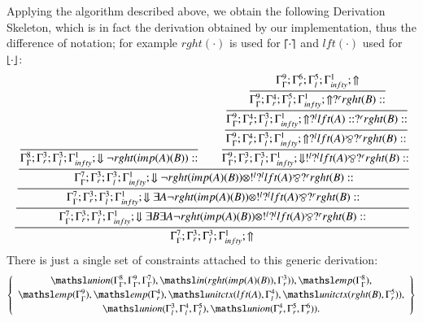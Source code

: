 \documentclass[a4paper,10pt]{article}
\newcommand{\elin}[2]{\ensuremath{{\tsl{unitctx}(\ensuremath{#1}, \ensuremath{#2})}}}
\newcommand{\emp}[1]{\ensuremath{{\tsl{emp}(\ensuremath{#1})}}}
\newcommand{\union}[3]{\ensuremath{{\tsl{union}(\ensuremath{#1},\ensuremath{#2},\ensuremath{ #3})}}}
\newcommand{\In}[2]{\ensuremath{\tsl{in}(\ensuremath{#1},\ensuremath{#2})}}
\begin{document}
Applying the algorithm described above, we obtain the following Derivation Skeleton, which is in fact the 
derivation obtained by our implementation, thus the difference of notation; for example $rght(\cdot)$ is used for
$\lceil \cdot \rceil$ and $lft(\cdot)$ used for $\lfloor \cdot \rfloor$:
{\small
\[
\cfrac{\cfrac{\cfrac{\cfrac{\cfrac{}
{\Gamma_{ \Gamma}^{8} ; \Gamma_{r}^{3} ; \Gamma_{l}^{3} ; \Gamma_{ infty}^{1} ;  \Downarrow \neg rght (imp (A) (B) )  :: }
\qquad
\cfrac{\cfrac{\cfrac{\cfrac{\Gamma_{ \Gamma}^{9} ; \Gamma_{r}^{6} ; \Gamma_{l}^{5} ; \Gamma_{ infty}^{1} ;  \Uparrow }
{\Gamma_{ \Gamma}^{9} ; \Gamma_{r}^{4} ; \Gamma_{l}^{5} ; \Gamma_{ infty}^{1} ;  \Uparrow  ?^{r} rght (B)  :: }}
{\Gamma_{ \Gamma}^{9} ; \Gamma_{r}^{4} ; \Gamma_{l}^{3} ; \Gamma_{ infty}^{1} ;  \Uparrow  ?^{l} lft (A)  ::  ?^{r} rght (B)  :: }}
{\Gamma_{ \Gamma}^{9} ; \Gamma_{r}^{4} ; \Gamma_{l}^{3} ; \Gamma_{ infty}^{1} ;  \Uparrow  ?^{l} lft (A)  \bindnasrepma  ?^{r} rght (B)  :: }}
{\Gamma_{ \Gamma}^{9} ; \Gamma_{r}^{3} ; \Gamma_{l}^{3} ; \Gamma_{ infty}^{1} ;  \Downarrow  !^{l}  ?^{l} lft (A)  \bindnasrepma  ?^{r} rght (B)  :: }}
{\Gamma_{ \Gamma}^{7} ; \Gamma_{r}^{3} ; \Gamma_{l}^{3} ; \Gamma_{ infty}^{1} ;  \Downarrow \neg rght (imp (A) (B) )  \otimes  !^{l}  ?^{l} lft (A)  \bindnasrepma  ?^{r} rght (B)  :: }}
{\Gamma_{ \Gamma}^{7} ; \Gamma_{r}^{3} ; \Gamma_{l}^{3} ; \Gamma_{ infty}^{1} ;  \Downarrow \exists A \neg rght (imp (A) (B) )  \otimes  !^{l}  ?^{l} lft (A)  \bindnasrepma  ?^{r} rght (B)  :: }}
{\Gamma_{ \Gamma}^{7} ; \Gamma_{r}^{3} ; \Gamma_{l}^{3} ; \Gamma_{ infty}^{1} ;  \Downarrow \exists B \exists A \neg rght (imp (A) (B) )  \otimes  !^{l}  ?^{l} lft (A)  \bindnasrepma  ?^{r} rght (B)  :: }}
{\Gamma_{ \Gamma}^{7} ; \Gamma_{r}^{3} ; \Gamma_{l}^{3} ; \Gamma_{ infty}^{1} ;  \Uparrow }
\]
}
There is just a single set of constraints attached to this generic derivation:
\[
 \left\{\begin{array}{c}
  \union{\Gamma_{ \Gamma}^{8}}{\Gamma_{ \Gamma}^{9}}{\Gamma_{ \Gamma}^{7}}, \In{rght (imp (A) (B)) }{ \Gamma_{r}^{3})}, 
  \emp{\Gamma_{ \Gamma}^{8}},\\[2pt]
  \emp{\Gamma_{ \Gamma}^{9}}, \emp{\Gamma_{r}^{4}},\elin{lft (A)}{ \Gamma_{l}^{4}},
  \elin{rght (B)}{ \Gamma_{r}^{5})},\\[2pt]
  \union{\Gamma_{l}^{3}} {\Gamma_{l}^{4}} {\Gamma_{l}^{5}},\union{\Gamma_{r}^{4}}{\Gamma_{r}^{5} } {\Gamma_{r}^{6})}.
 \end{array}\right\}
\]
\end{document}
